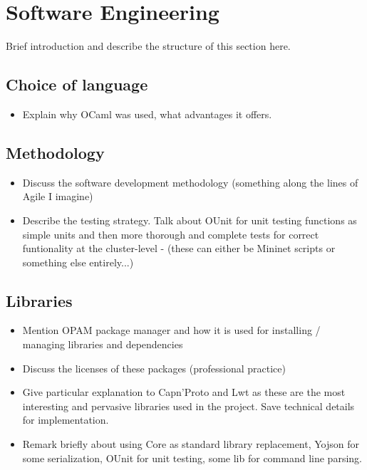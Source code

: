 \documentclass[12pt,twoside,notitlepage]{report}
\begin{document}
\section{Software Engineering}

Brief introduction and describe the structure of this section here.

\subsection{Choice of language}

\begin{itemize}
  \item Explain why OCaml was used, what advantages it offers.
\end{itemize}

\subsection{Methodology}

\begin{itemize}
  \item Discuss the software development methodology (something along the lines of Agile I imagine)
  \item Describe the testing strategy. Talk about OUnit for unit testing functions as simple units and then more thorough and complete tests for correct funtionality at the cluster-level - (these can either be Mininet scripts or something else entirely...)
\end{itemize}

\subsection{Libraries}

\begin{itemize}
  \item Mention OPAM package manager and how it is used for installing / managing libraries and dependencies
  \item Discuss the licenses of these packages (professional practice)
  \item Give particular explanation to Capn'Proto and Lwt as these are the most interesting and pervasive libraries used in the project. Save technical details for implementation.
  \item Remark briefly about using Core as standard library replacement, Yojson for some serialization, OUnit for unit testing, some lib for command line parsing.
\end{itemize}
\end{document}

